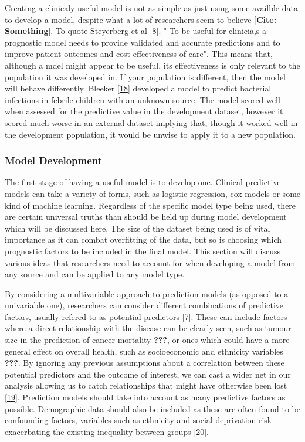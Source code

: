 \documentclass[
]{article}
\begin{document}
Creating a clinicaly useful model is not as simple as just using some availble data to develop a model, despite what a lot of researchers seem to believe {[}\textbf{Cite: Something}{]}. To quote Steyerberg et al {[}\protect\hyperlink{ref-steyerberg_prognosis_2013}{8}{]}. " To be useful for clinicia,s a prognostic model needs to provide validated and accurate predictions and to improve patient outcomes and cost-effectiveness of care". This means that, although a mdel might appear to be useful, its effectiveness is only relevant to the population it was developed in. If your population is different, then the model will behave differently. Bleeker {[}\protect\hyperlink{ref-bleeker_external_2003}{18}{]} developed a model to predict bacterial infections in febrile children with an unknown source. The model scored well when assessed for the predictive value in the development dataset, however it scored much worse in an external dataset implying that, though it worked well in the development population, it would be unwise to apply it to a new population.

\hypertarget{model-development}{%
\subsubsection{Model Development}\label{model-development}}

The first stage of having a useful model is to develop one. Clinical predictive models can take a variety of forms, such as logistic regression, cox models or some kind of machine learning. Regardless of the specific model type being used, there are certain universal truths than should be held up during model development which will be discussed here. The size of the dataset being used is of vital importance as it can combat overfitting of the data, but so is choosing which prognostic factors to be included in the final model. This section will discuss various ideas that researchers need to account for when developing a model from any source and can be applied to any model type.

By considering a multivariable approach to prediction models (as opposed to a univariable one), researchers can consider different combinations of predictive factors, usually refered to as potential predictors {[}\protect\hyperlink{ref-riley_prognosis_2013}{7}{]}. These can include factors where a direct relationship with the disease can be clearly seen, such as tumour size in the prediction of cancer mortality {\textbf{???}}, or ones which could have a more general effect on overall health, such as socioeconomic and ethnicity variables {\textbf{???}}. By ignoring any previous assumptions about a correlation between these potential predictors and the outcome of interest, we can cast a wider net in our analysis allowing us to catch relationships that might have otherwise been lost {[}\protect\hyperlink{ref-hanauer_exploring_2009}{19}{]}. Prediction models should take into account as many predictive factors as possible. Demographic data should also be included as these are often found to be confounding factors, variables such as ethnicity and social deprivation risk exacerbating the existing inequality between groups {[}\protect\hyperlink{ref-hippisley-cox_predicting_2008}{20}{]}.
\end{document}
